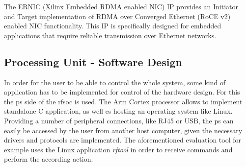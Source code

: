 The ERNIC (Xilinx Embedded RDMA enabled NIC) IP provides an Initiator and Target  implementation of RDMA over Converged Ethernet (RoCE v2) enabled NIC functionality. This IP is specifically designed for embedded applications that require reliable transmission over Ethernet networks.



\subsection{Processing Unit - Software Design}
In order for the user to be able to control the whole system, some kind of application has to be implemented for control of the hardware design.
For this the \gls{ps} side of the \gls{rfsoc} is used. 
The Arm Cortex processor allows to implement standalone C application, as well es hosting an operating system like Linux. 
Providing a number of peripheral connections, like RJ45 or USB, the \gls{ps} can easily be accessed by the user from another host computer, given the necessary drivers and protocols are implemented.
The aforementioned evaluation tool for example uses the Linux application \textit{rftool} in order to receive commands and perform the according action.

